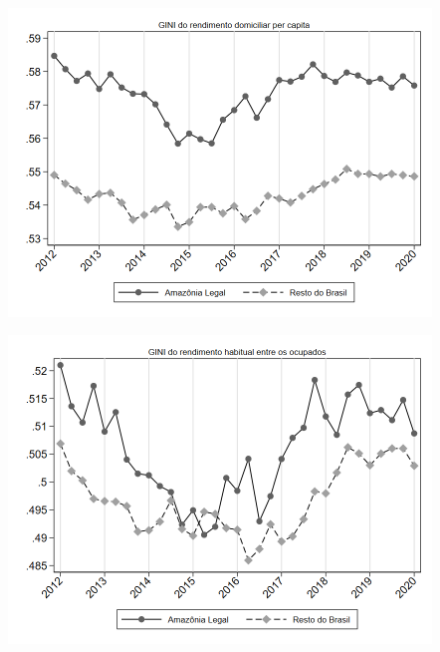 \begin{frame}[label=_estrutura_renda_gini_rendimento_domiciliar_pc]{}
\textit{\hyperlink{_estrutura_renda}{}}
\begin{figure}
  \centering
  \includegraphics[width=1.0\linewidth]{../../analysis/output/estrutura_renda/_estrutura_renda_gini_rendimento_domiciliar_pc.png}
  \caption{}
  \label{fig:_estrutura_renda_gini_rendimento_domiciliar_pc}
\end{figure}
\end{frame}

\begin{frame}[label=_estrutura_renda_gini_ocupado]{}
\textit{\hyperlink{_estrutura_renda}{}}
\begin{figure}
  \centering
  \includegraphics[width=1.0\linewidth]{../../analysis/output/estrutura_renda/_estrutura_renda_gini_ocupado.png}
  \caption{}
  \label{fig:_estrutura_renda_gini_ocupado}
\end{figure}
\end{frame}

